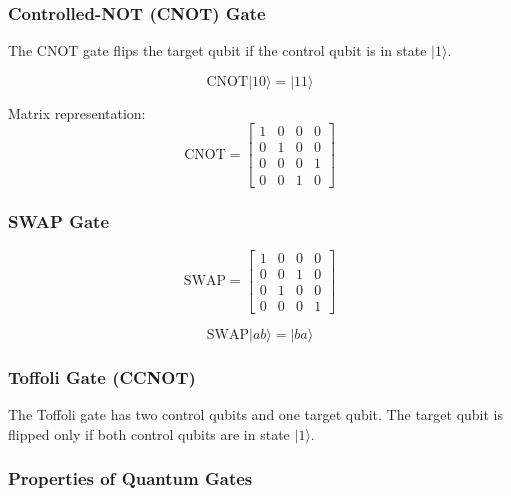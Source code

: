 \subsubsection{Controlled-NOT (CNOT) Gate}

The CNOT gate flips the target qubit if the control qubit is in state $|1\rangle$.

\begin{equation}
\text{CNOT} |10\rangle = |11\rangle
\end{equation}

Matrix representation:
\begin{equation}
\text{CNOT} =
\begin{bmatrix}
1 & 0 & 0 & 0 \\
0 & 1 & 0 & 0 \\
0 & 0 & 0 & 1 \\
0 & 0 & 1 & 0
\end{bmatrix}
\end{equation}

\subsubsection{SWAP Gate}

\begin{equation}
\text{SWAP} =
\begin{bmatrix}
1 & 0 & 0 & 0 \\
0 & 0 & 1 & 0 \\
0 & 1 & 0 & 0 \\
0 & 0 & 0 & 1
\end{bmatrix}
\end{equation}

\begin{equation}
\text{SWAP} |ab\rangle = |ba\rangle
\end{equation}



\subsubsection{Toffoli Gate (CCNOT)}

The Toffoli gate has two control qubits and one target qubit. The target qubit is flipped 
only if both control qubits are in state $|1\rangle$.

\subsubsection{Properties of Quantum Gates}

